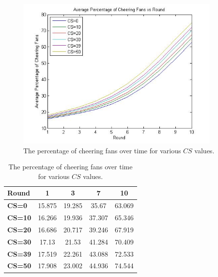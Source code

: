 \documentclass[oneside,12pt]{report}
\begin{document}
\begin{figure} [h!]
		\begin{center}
    			\includegraphics [width=4in] {46(2).jpg}
    			\caption [Plot of Percentage of Cheering Fans Over Time for Various Number of Cheer Starters] {The percentage of cheering fans over time for various $CS$ values.}
    			\label{varcsgraph}
    		\end{center}
\end {figure}

\begin{table}[h!]
\begin{center}
	\begin{small}\begin{tabular}{|l|c|c|c|c|}
\hline
\textbf{Round}&1&3&7&10\\\hline
\textbf{CS=0}&15.875&19.285&35.67&63.069\\\hline
\textbf{CS=10}&16.266&19.936&37.307&65.346\\\hline
\textbf{CS=20}&16.686&20.717&39.246&67.919\\\hline
\textbf{CS=30}&17.13&21.53&41.284&70.409\\\hline
\textbf{CS=39}&17.519&22.261&43.088&72.533\\\hline
\textbf{CS=50}&17.908&23.002&44.936&74.544\\\hline
\end{tabular}
\end{small}
\end{center}
\caption{The percentage of cheering fans over time for various $CS$ values.}
\label{varcstable}
\end{table}
	
\end{document}
